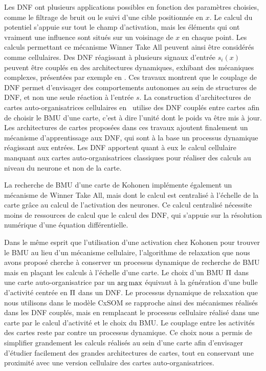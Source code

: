 \documentclass[../main]{subfiles}
\begin{document}
Les DNF ont plusieurs applications possibles en fonction des paramètres choisies, comme le filtrage de bruit ou le suivi d'une cible positionnée en $x$.
Le calcul du potentiel s'appuie sur tout le champ d'activation, mais les éléments qui ont vraiment une influence sont situés sur un voisinage de $x$ en chaque point. Les calculs permettant ce mécanisme Winner Take All peuvent ainsi être considérés comme cellulaires.
Des DNF réagissant à plusieurs signaux d'entrée $s_i(x)$ peuvent être couplés en des architectures dynamiques, exhibant des mécaniques complexes, présentées par exemple en \cite{Fix2011ADN, Sandamirskaya2014DynamicNF}.
Ces travaux montrent que le couplage de DNF permet d'envisager des comportements autonomes au sein de structures de DNF, et non une seule réaction à l'entrée $s$.
La construction d'architectures de cartes auto-organisatrices cellulaires en~\cite{khouzam_neural_2014,menard05} utilise des DNF couplés entre cartes afin de choisir le BMU d'une carte, c'est à dire l'unité dont le poids va être mis à jour.
Les architectures de cartes proposées dans ces travaux ajoutent finalement un mécanisme d'apprentissage aux DNF, qui sont à la base un processus dynamique réagissant aux entrées. 
Les DNF apportent quant à eux le calcul cellulaire manquant aux cartes auto-organisatrices classiques pour réaliser des calculs au niveau du neurone et non de la carte.

La recherche de BMU d'une carte de Kohonen implémente également un mécanisme de Winner Take All, mais dont le calcul est centralisé à l'échelle de la carte grâce au calcul de l'activation des neurones.
Ce calcul centralisé nécessite moins de ressources de calcul que le calcul des DNF, qui s'appuie sur la résolution numérique d'une équation différentielle.

Dans le même esprit que l'utilisation d'une activation chez Kohonen pour trouver le BMU au lieu d'un mécanisme cellulaire, l'algorithme de relaxation que nous avons proposé cherche à conserver un processus dynamique de recherche de BMU mais en plaçant les calculs à l'échelle d'une carte. 
Le choix d'un BMU $\Pi$ dans une carte auto-organisatrice par un $\operatorname*{arg\,max}$ équivaut à la génération d'une bulle d'activité centrée en $\Pi$ dans un DNF. 
Le processus dynamique de relaxation que nous utilisons dans le modèle CxSOM se rapproche ainsi des mécanismes réalisés dans les DNF couplés, mais en remplacant le processus cellulaire réalisé dans une carte par le calcul d'activité et le choix du BMU. Le couplage entre les activités des cartes reste par contre un processus dynamique.
Ce choix nous a permis de simplifier grandement les calculs réalisés au sein d'une carte afin d'envisager d'étudier facilement des grandes architectures de cartes, tout en conservant une proximité avec une version cellulaire des cartes auto-organisatrices.
\end{document}
